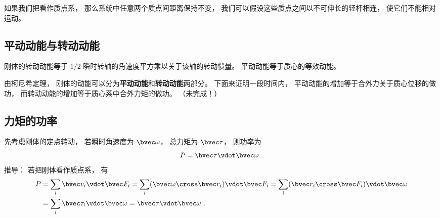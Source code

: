 
\begin{issues}
\issueDraft
\end{issues}


如果我们把看作质点系， 那么系统中任意两个质点间距离保持不变， 我们可以假设这些质点之间以不可伸长的轻杆相连， 使它们不能相对运动。

\subsection{平动动能与转动动能}

刚体的转动动能等于 $1/2$ 瞬时转轴的角速度平方乘以关于该轴的转动惯量。 平动动能等于质心的等效动能。

由柯尼希定理， 刚体的动能可以分为\textbf{平动动能}和\textbf{转动动能}两部分。 下面来证明一段时间内， 平动动能的增加等于合外力关于质心位移的做功， 而转动动能的增加等于质心系中合外力矩的做功。
（未完成！）

\subsection{力矩的功率}
先考虑刚体的定点转动， 若瞬时角速度为 $\bvec \omega$， 总力矩为 $\bvec \tau$， 则功率为
\begin{equation}
P = \bvec \tau\vdot \bvec \omega~.
\end{equation}
推导： 若把刚体看作质点系， 有
\begin{equation}
\begin{aligned}
P &= \sum_i \bvec v_i \vdot \bvec F_i
= \sum_i (\bvec \omega \cross \bvec r_i) \vdot \bvec F_i
= \sum_i (\bvec r_i\cross\bvec F_i)\vdot \bvec \omega\\
&= \sum_i \bvec \tau_i \vdot \bvec \omega = \bvec \tau\vdot \bvec \omega~.
\end{aligned}
\end{equation}



